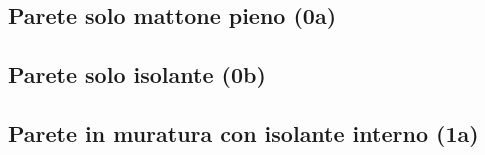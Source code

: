 \documentclass[a4paper,10pt]{report}
\begin{document}

\tableofcontents
\clearpage
\begingroup
    \let\clearpage\relax        %
        \listoftables
        \listoffigures
\endgroup
%



\clearpage
\begin{landscape}
        \subsection*{Parete solo mattone pieno (0a)}
                \begin{minipage}[c]{0.3\linewidth}
                        
                \end{minipage}
                \hspace*{0.15\linewidth}
                \begin{minipage}[c]{0.55\linewidth}
                            
                \end{minipage}
                \subsection*{Parete solo isolante (0b)}
                \begin{minipage}[c]{0.3\linewidth}
                        
                \end{minipage}
                \hspace*{0.15\linewidth}
                \begin{minipage}[c]{0.55\linewidth}
                            
                \end{minipage}
        \subsection*{Parete in muratura con isolante interno (1a)}
                \begin{minipage}[c]{0.3\linewidth}
                        
                \end{minipage}
                \hspace*{0.15\linewidth}
                \begin{minipage}[c]{0.55\linewidth}
                            
                \end{minipage}

\end{landscape}
\end{document}
